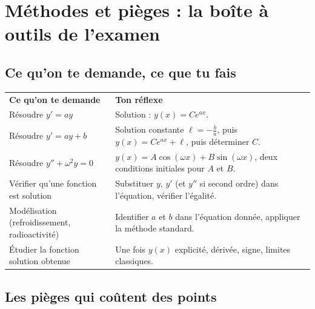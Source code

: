 \documentclass[11pt,a4paper]{article}
\begin{document}
\section{Méthodes et pièges : la boîte à outils de l'examen}

\subsection{Ce qu'on te demande, ce que tu fais}

\begin{center}
\renewcommand{\arraystretch}{1.45}
\sffamily\small
\begin{tabular}{>{\raggedright\arraybackslash}p{7.2cm} >{\raggedright\arraybackslash}p{8cm}}
\rowcolor{qtealdark} \color{white}\bfseries Ce qu'on te demande & \color{white}\bfseries Ton réflexe \\
\rowcolor{tealpale} Résoudre $y'=ay$ & Solution : $y(x)=Ce^{ax}$. \\
Résoudre $y'=ay+b$ & Solution constante $\ell=-\frac ba$, puis $y(x)=Ce^{ax}+\ell$, puis déterminer $C$. \\
\rowcolor{tealpale} Résoudre $y''+\omega^2y=0$ & $y(x)=A\cos(\omega x)+B\sin(\omega x)$, deux conditions initiales pour $A$ et $B$. \\
Vérifier qu'une fonction est solution & Substituer $y$, $y'$ (et $y''$ si second ordre) dans l'équation, vérifier l'égalité. \\
\rowcolor{tealpale} Modélisation (refroidissement, radioactivité) & Identifier $a$ et $b$ dans l'équation donnée, appliquer la méthode standard. \\
Étudier la fonction solution obtenue & Une fois $y(x)$ explicité, dérivée, signe, limites classiques. \\
\end{tabular}
\end{center}

\subsection{Les pièges qui coûtent des points}
\end{document}
